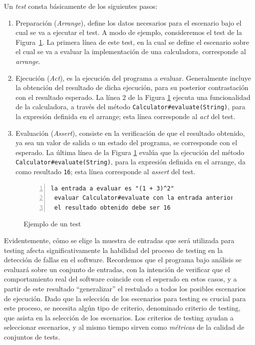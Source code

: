 Un \emph{test} consta b\'asicamente de los siguientes pasos: 
\begin{enumerate}
	\item Preparaci\'on (\emph{Arrange}), define los datos necesarios para el escenario bajo el cual se va a ejecutar el test. A modo de ejemplo, consideremos el test de la Figura~\ref{figures.examples.test.manual}. La primera l\'inea de este test, en la cual se define el escenario sobre el cual se va a evaluar la implementaci\'on de una calculadora, corresponde al \emph{arrange}.
	
	\item Ejecuci\'on (\emph{Act}), es la ejecuci\'on del programa a evaluar. Generalmente incluye la obtenci\'on del resultado de dicha ejecuci\'on, para su posterior contrastaci\'on con el resultado esperado. La l\'inea 2 de la Figura \ref{figures.examples.test.manual} ejecuta una funcionalidad de la calculadora, a trav\'es del m\'etodo \texttt{Calculator\#evaluate(String)}, para la expresi\'on definida en el arrange; esta l\'inea corresponde al \emph{act} del test. 
	
	\item Evaluaci\'on (\emph{Assert}), consiste en la verificaci\'on de que el resultado obtenido, ya sea un valor de salida o un estado del programa, se corresponde con el esperado. La \'ultima l\'inea de la Figura \ref{figures.examples.test.manual} eval\'ua que la ejecuci\'on del m\'etodo \texttt{Calculator\#evaluate(String)}, para la expresi\'on definida en el arrange, da como resultado \texttt{16}; esta l\'inea corresponde al \emph{assert} del test.
\end{enumerate}

\begin{figure}
	\begin{lstlisting}[frame=single, mathescape=true,numbers=left,framexleftmargin=1.5em]
 la entrada a evaluar es "(1 + 3)^2"
 evaluar Calculator#evaluate con la entrada anterior
 el resultado obtenido debe ser 16
	\end{lstlisting}
	\caption{Ejemplo de un test}
	\label{figures.examples.test.manual}
\end{figure}

Evidentemente, c\'omo se elige la muestra de entradas que ser\'a utilizada para testing afecta significativamente la habilidad del proceso de testing en la detecci\'on de fallas en el software. Recordemos que el programa bajo an\'alisis se evaluar\'a sobre un conjunto de entradas, con la intenci\'on de verificar que el comportamiento real del software coincide con el esperado en estos casos, y a partir de este resultado ``generalizar'' el restulado a todos los posibles escenarios de ejecuci\'on. Dado que la selecci\'on de los escenarios para testing es crucial para este proceso, se necesita alg\'un tipo de criterio, denominado criterio de testing, que asista en la selecci\'on de los escenarios. Los criterios de testing ayudan a seleccionar escenarios, y al mismo tiempo sirven como \emph{m\'etricas} de la calidad de conjuntos de tests. 


